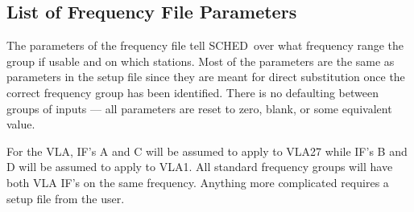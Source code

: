 \documentclass{report}
\newcommand{\schedb}{{\sc SCHED~}}
\begin{document}
\subsection{\label{SSEC:FREQLST}List of Frequency File Parameters}

The parameters of the frequency file tell \schedb over what frequency
range the group if usable and on which stations.  Most of the parameters
are the same as parameters in the setup file since they are meant
for direct substitution once the correct frequency group has been
identified.  There is no defaulting between groups of inputs --- all
parameters are reset to zero, blank, or some equivalent value.

For the VLA, IF's A and C will be assumed to apply to VLA27 while
IF's B and D will be assumed to apply to VLA1.  All standard
frequency groups will have both VLA IF's on the same frequency.
Anything more complicated requires a setup file from the user.
\end{document}
